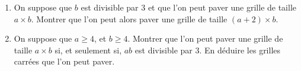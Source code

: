 \begin{enumerate}
\begin{enumerate}
\end{enumerate}

\item On suppose que $b$ est divisible par 3 et que l'on peut paver une grille de taille $a \times b$. Montrer que l'on peut alors paver une grille de taille $(a + 2) \times b$.



\item On suppose que $a \geq 4$, et $b \geq 4$. Montrer que l'on peut paver une grille de taille $a \times b$ si, et seulement si, $ab$ est divisible par 3. En déduire les grilles carrées que l'on peut paver.


\end{enumerate}
